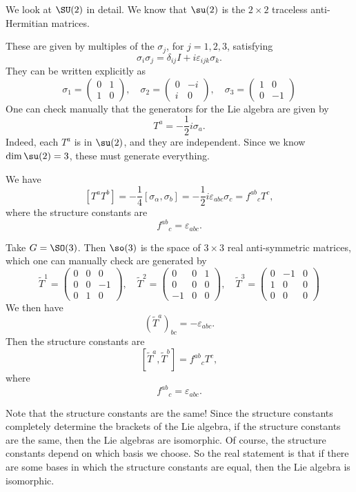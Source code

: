 \documentclass[a4paper]{article}
\begin{document}
\begin{eg}
  We look at $\SU(2)$ in detail. We know that $\su(2)$ is the $2 \times 2$ traceless anti-Hermitian matrices.

  These are given by multiples of the  $\sigma_j$, for $j = 1, 2, 3$, satisfying
  \[
    \sigma_i \sigma_j = \delta_{ij}I + i \varepsilon_{ijk} \sigma_k.
  \]
  They can be written explicitly as
  \[
    \sigma_1 =
    \begin{pmatrix}
      0 & 1\\
      1 & 0
    \end{pmatrix},\quad
    \sigma_2 =
    \begin{pmatrix}
      0 & -i\\
      i & 0
    \end{pmatrix},\quad
    \sigma_3 =
    \begin{pmatrix}
      1 & 0\\
      0 & -1
    \end{pmatrix}
  \]
  One can check manually that the generators for the Lie algebra are given by
  \[
    T^a = -\frac{1}{2} i \sigma_a.
  \]
  Indeed, each $T^a$ is in $\su(2)$, and they are independent. Since we know $\dim \su(2) = 3$, these must generate everything.

  We have
  \[
    [T^a T^b] = -\frac{1}{4}[\sigma_\alpha, \sigma_b] = -\frac{1}{2} i \varepsilon_{abc} \sigma_c = f^{ab}\!_c T^c,
  \]
  where the structure constants are
  \[
    f^{ab}\!_c = \varepsilon_{abc}.
  \]
\end{eg}

\begin{eg}
  Take $G = \SO(3)$. Then $\so(3)$ is the space of $3 \times 3$ real anti-symmetric matrices, which one can manually check are generated by
  \[
    \tilde{T}^1 =
    \begin{pmatrix}
      0 & 0 & 0\\
      0 & 0 & -1\\
      0 & 1 & 0
    \end{pmatrix},\quad
    \tilde{T}^2 =
    \begin{pmatrix}
      0 & 0 & 1\\
      0 & 0 & 0\\
      -1 & 0 & 0
    \end{pmatrix},\quad
    \tilde{T}^3 =
    \begin{pmatrix}
      0 & -1 & 0\\
      1 & 0 & 0\\
      0 & 0 & 0
    \end{pmatrix}
  \]
  We then have
  \[
    (\tilde{T}^a)_{bc} = -\varepsilon_{abc}.
  \]
  Then the structure constants are
  \[
    [\tilde{T}^a, \tilde{T}^b] = f^{ab}\!_c T^c,
  \]
  where
  \[
    f^{ab}\!_{c} = \varepsilon_{abc}.
  \]
\end{eg}
Note that the structure constants are the same! Since the structure constants completely determine the brackets of the Lie algebra, if the structure constants are the same, then the Lie algebras are isomorphic. Of course, the structure constants depend on which basis we choose. So the real statement is that if there are some bases in which the structure constants are equal, then the Lie algebra is isomorphic.
\end{document}
